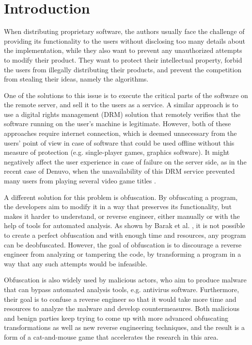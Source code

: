 \documentclass[
  digital, %
  notable,   %
  twoside, %
  nolof,     %
  nolot,     %
]{fithesis3}
\theoremstyle{definition}
\begin{document}
\chapter{Introduction}
When distributing proprietary software, the authors usually face the challenge of providing its functionality to the users without disclosing too many details about the implementation, while they also want to prevent any unauthorized attempts to modify their product. They want to protect their intellectual property, forbid the users from illegally distributing their products, and prevent the competition from stealing their ideas, namely the algorithms. 

One of the solutions to this issue is to execute the critical parts of the software on the remote server, and sell it to the users as a service. A similar approach is to use a digital rights management (DRM) solution that remotely verifies that the software running on the user's machine is legitimate. However, both of these approaches require internet connection, which is deemed unnecessary from the users' point of view in case of software that could be used offline without this measure of protection (e.g. single-player games, graphics software). It might negatively affect the user experience in case of failure on the server side, as in the recent case of Denuvo, when the unavailability of this DRM service prevented many users from playing several video game titles \cite{denuvo}. 

A different solution for this problem is obfuscation. By obfuscating a program, the developers aim to modify it in a way that preserves its functionality, but makes it harder to understand, or reverse engineer, either manually or with the help of tools for automated analysis. As shown by Barak et al. \cite{barak2001}, it is not possible to create a perfect obfuscation and with enough time and resources, any program can be deobfuscated. However, the goal of obfuscation is to discourage a reverse engineer from analyzing or tampering the code, by transforming a program in a way that any such attempts would be infeasible. 

Obfuscation is also widely used by malicious actors, who aim to produce malware that can bypass automated analysis tools, e.g. antivirus software. Furthermore, their goal is to confuse a reverse engineer so that it would take more time and resources to analyze the malware and develop countermeasures. Both malicious and benign parties keep trying to come up with more advanced obfuscating transformations as well as new reverse engineering techniques, and the result is a form of a cat-and-mouse game that accelerates the research in this area. 
\end{document}
